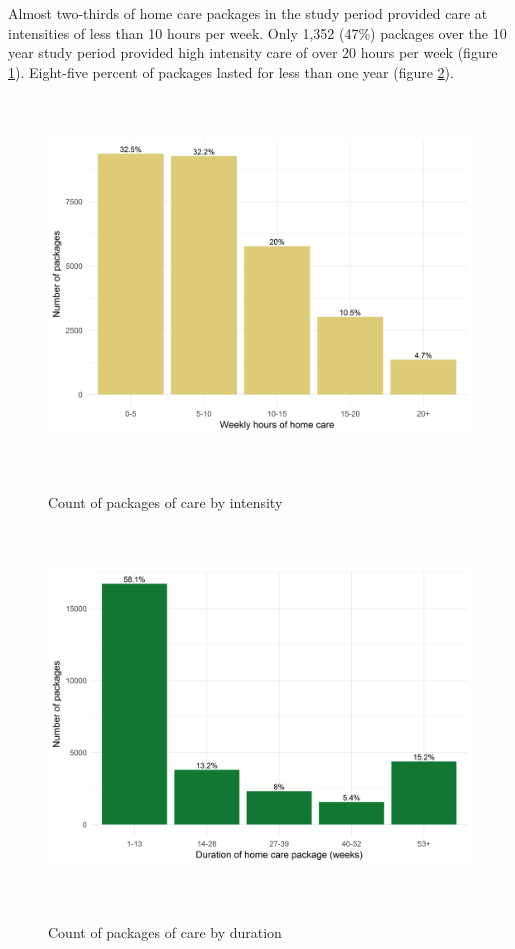 \documentclass[]{article}
\begin{document}
Almost two-thirds of home care packages in the study period provided
care at intensities of less than 10 hours per week. Only 1,352 (47\%)
packages over the 10 year study period provided high intensity care of
over 20 hours per week (figure \ref{fig:ren-hrs}). Eight-five percent of
packages lasted for less than one year (figure \ref{fig:ren-duration}).

\begin{figure}[h]
  \centering
    \caption{Count of packages of care by intensity}
    \includegraphics[height = 10cm, width = 12cm]{figures/chapter-renf/04-hrs-plot-ts-subset.png}
    \label{fig:ren-hrs}
\end{figure}

\begin{figure}[]
  \centering
    \caption{Count of packages of care by duration}
    \includegraphics[height = 10cm, width = 12cm]{figures/chapter-renf/05-duration-plot.png}
    \label{fig:ren-duration}
\end{figure}
\end{document}
